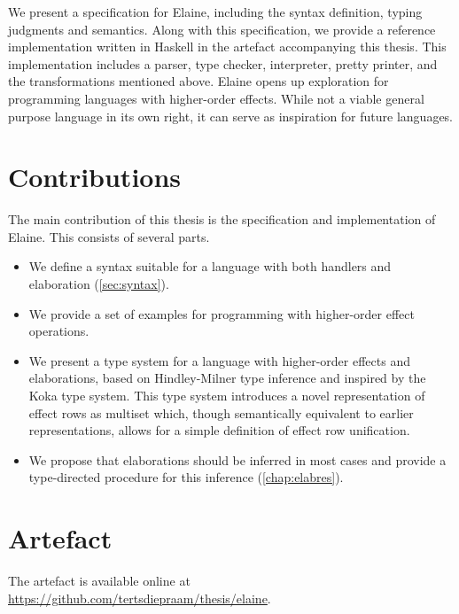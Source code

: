 We present a specification for Elaine, including the syntax definition, typing judgments and semantics. Along with this specification, we provide a reference implementation written in Haskell in the artefact accompanying this thesis. This implementation includes a parser, type checker, interpreter, pretty printer, and the transformations mentioned above. Elaine opens up exploration for programming languages with higher-order effects. While not a viable general purpose language in its own right, it can serve as inspiration for future languages.


\section{Contributions}

The main contribution of this thesis is the specification and implementation of Elaine. This consists of several parts.

\begin{itemize}
    \item We define a syntax suitable for a language with both handlers and elaboration (\cref{sec:syntax}).
    \item We provide a set of examples for programming with higher-order effect operations.
    \item We present a type system for a language with higher-order effects and elaborations, based on Hindley-Milner type inference and inspired by the Koka type system. This type system introduces a novel representation of effect rows as multiset which, though semantically equivalent to earlier representations, allows for a simple definition of effect row unification.
    \item We propose that elaborations should be inferred in most cases and provide a type-directed procedure for this inference (\cref{chap:elabres}).
\end{itemize}

\section{Artefact}\label{sec:artefact}


The artefact is available online at \url{https://github.com/tertsdiepraam/thesis/elaine}.
